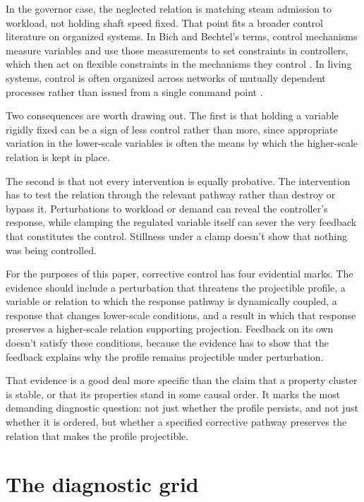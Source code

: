 \documentclass[12pt]{article}
\begin{document}
In the governor case, the neglected relation is matching steam admission to
workload, not holding shaft speed fixed. That point fits a broader control
literature on organized systems. In Bich and Bechtel's terms, control mechanisms
measure variables and use those measurements to set constraints in controllers,
which then act on flexible constraints in the mechanisms they control
\citep{bichBechtel2022control}. In living systems, control is often organized
across networks of mutually dependent processes rather than issued from a single
command point \citep{bichMossioEtAl2016,bichBechtel2022organization}.

Two consequences are worth drawing out. The first is that holding a variable
rigidly fixed can be a sign of less control rather than more, since appropriate
variation in the lower-scale variables is often the means by which the
higher-scale relation is kept in place.

The second is that not every intervention is equally probative. The intervention
has to test the relation through the relevant pathway rather than destroy or
bypass it. Perturbations to workload or demand can reveal the controller's
response, while clamping the regulated variable itself can sever the very
feedback that constitutes the control. Stillness under a clamp doesn't show that
nothing was being controlled.

For the purposes of this paper, corrective control has four evidential marks. The
evidence should include a perturbation that threatens the projectible profile, a
variable or relation to which the response pathway is dynamically coupled, a
response that changes lower-scale conditions, and a result in which that response
preserves a higher-scale relation supporting projection. Feedback on its own
doesn't satisfy these conditions, because the evidence has to show that the
feedback explains why the profile remains projectible under perturbation.

That evidence is a good deal more specific than the claim that a property cluster
is stable, or that its properties stand in some causal order. It marks the most
demanding diagnostic question: not just whether the profile persists, and not just
whether it is ordered, but whether a specified corrective pathway preserves the
relation that makes the profile projectible.

\section{The diagnostic grid}
\end{document}
